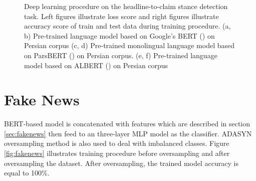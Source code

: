 \begin{figure}
	\qquad
	
	
	\caption{Deep learning procedure on the headline-to-claim stance detection task. Left figures illustrate loss score and right figures illustrate accuracy score of train and test data during training procedure. (a, b) Pre-trained language model based on Google's BERT (\cite{parsbert}) on Persian corpus (c, d) Pre-trained monolingual language model based on ParsBERT (\cite{parsbert}) on Persian corpus. (e, f) Pre-trained language model based on ALBERT (\cite{albert}) on Persian corpus}%
	\label{fig:deep}%
\end{figure}


\section{Fake News}
BERT-based model is concatenated with features which are described in section \ref{sec:fakenews} then feed to an three-layer MLP model as the classifier. ADASYN oversampling method is also used to deal with imbalanced classes. Figure \ref{fig:fakenews} illustrates training procedure before oversampling and after oversampling the dataset. After oversampling, the trained model accuracy is equal to 100\%.